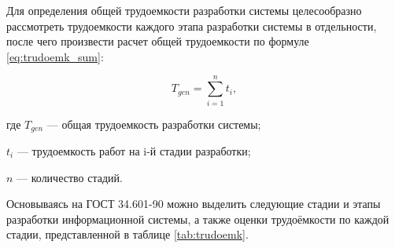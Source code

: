 Для определения общей трудоемкости разработки системы целесообразно рассмотреть трудоемкости каждого этапа разработки системы в отдельности, после чего произвести расчет общей трудоемкости по формуле \ref{eq:trudoemk_sum}:

\begin{equation}
	\label{eq:trudoemk_sum}
	T_{gen} = \sum^{n}_{i=1}t_{i},
\end{equation}
\begin{ESKDexplanation}
	\item где $T_{gen}$ --- общая трудоемкость разработки системы;
	\item $t_{i}$ --- трудоемкость работ на i-й стадии разработки;
	\item $n$ --- количество стадий.
\end{ESKDexplanation}

Основываясь на ГОСТ 34.601-90\cite{gost34601} можно выделить следующие стадии и этапы разработки информационной системы, а также оценки трудоёмкости по каждой стадии, представленной в таблице \ref{tab:trudoemk}.

